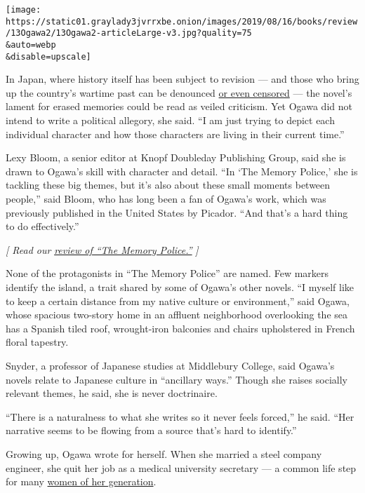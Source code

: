 \texttt{[image: https://static01.graylady3jvrrxbe.onion/images/2019/08/16/books/review/13Ogawa2/13Ogawa2-articleLarge-v3.jpg?quality=75\\\&auto=webp\\\&disable=upscale]}

In Japan, where history itself has been subject to revision --- and
those who bring up the country's wartime past can be denounced
\href{https://www.nytimes3xbfgragh.onion/2019/08/05/world/asia/japan-aichi-trienniale.html}{or
even censored} --- the novel's lament for erased memories could be read
as veiled criticism. Yet Ogawa did not intend to write a political
allegory, she said. ``I am just trying to depict each individual
character and how those characters are living in their current time.''

Lexy Bloom, a senior editor at Knopf Doubleday Publishing Group, said
she is drawn to Ogawa's skill with character and detail. ``In `The
Memory Police,' she is tackling these big themes, but it's also about
these small moments between people,'' said Bloom, who has long been a
fan of Ogawa's work, which was previously published in the United States
by Picador. ``And that's a hard thing to do effectively.''

\emph{{[} Read our}
\href{https://www.nytimes3xbfgragh.onion/2019/08/15/books/review/read-receipts-on-two-dystopian-novels-predict-the-surveillance-state.html}{\emph{review
of ``The Memory Police.''}} \emph{{]}}

None of the protagonists in ``The Memory Police'' are named. Few markers
identify the island, a trait shared by some of Ogawa's other novels. ``I
myself like to keep a certain distance from my native culture or
environment,'' said Ogawa, whose spacious two-story home in an affluent
neighborhood overlooking the sea has a Spanish tiled roof, wrought-iron
balconies and chairs upholstered in French floral tapestry.

Snyder, a professor of Japanese studies at Middlebury College, said
Ogawa's novels relate to Japanese culture in ``ancillary ways.'' Though
she raises socially relevant themes, he said, she is never doctrinaire.

``There is a naturalness to what she writes so it never feels forced,''
he said. ``Her narrative seems to be flowing from a source that's hard
to identify.''

Growing up, Ogawa wrote for herself. When she married a steel company
engineer, she quit her job as a medical university secretary --- a
common life step for many
\href{https://www.nytimes3xbfgragh.onion/2019/02/02/world/asia/japan-working-mothers.html}{women
of her generation}.

